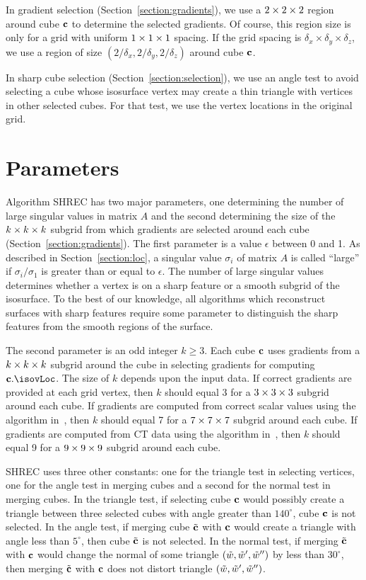 In gradient selection (Section~\ref{section:gradients}),
we use a $2 \times 2 \times 2$ region around cube $\mathbf{c}$ to determine
the selected gradients.
Of course, this region size is only for a grid 
with uniform $1 \times 1 \times 1$ spacing.
If the grid spacing is $\delta_x \times \delta_y \times \delta_z$,
we use a region of size $(2/\delta_x, 2/\delta_y, 2/\delta_z)$
around cube $\mathbf{c}$.

In sharp cube selection (Section~\ref{section:selection}),
we use an angle test to avoid selecting a cube 
whose isosurface vertex may create a thin triangle 
with vertices in other selected cubes.
For that test,
we use the vertex locations in the original grid.


\section{Parameters}
\label{section:parameters}

Algorithm SHREC has two major parameters,
one determining the number of large singular values in matrix $A$
and the second determining the size of the $k \times k \times k$ subgrid 
from which gradients are selected around each cube
(Section~\ref{section:gradients}).
The first parameter is a value $\epsilon$ between 0 and 1.
As described in Section~\ref{section:loc},
a singular value $\sigma_i$ of matrix $A$ 
is called ``large'' if $\sigma_i/\sigma_1$ 
is greater than or equal to $\epsilon$.
The number of large singular values determines whether a vertex
is on a sharp feature or a smooth subgrid of the isosurface.
To the best of our knowledge, all algorithms which reconstruct surfaces 
with sharp features require some parameter
to distinguish the sharp features from the smooth regions of the surface.

The second parameter is an odd integer $k \ge 3$.
Each cube $\mathbf{c}$ uses gradients from a $k \times k \times k$ subgrid around the cube
in selecting gradients for computing $\cb.\isovLoc$.
The size of $k$ depends upon the input data.
If correct gradients are provided at each grid vertex,
then $k$ should equal 3 for a $3 \times 3 \times 3$ subgrid around each cube.
If gradients are computed from correct scalar values 
using the algorithm in~\cite{bw-crgsd-15},
then $k$ should equal 7 for a $7 \times 7 \times 7$ subgrid around each cube.
If gradients are computed from CT data 
using the algorithm in~\cite{bw-crgsd-15},
then $k$ should equal 9 for a $9 \times 9 \times 9$ subgrid around each cube.

SHREC uses three other constants:
one for the triangle test in selecting vertices,
one for the angle test in merging cubes
and a second for the normal test in merging cubes.
In the triangle test,
if selecting cube $\mathbf{c}$ would possibly create a triangle between three
selected cubes with angle greater than $140^\circ$, 
cube $\mathbf{c}$ is not selected.
In the angle test,
if merging cube ${\tilde{\mathbf{c}}}$ with $\mathbf{c}$ would create a triangle with angle
less than $5^\circ$, then cube ${\tilde{\mathbf{c}}}$ is not selected.
In the normal test,
if merging ${\tilde{\mathbf{c}}}$ with $\mathbf{c}$ would change the normal 
of some triangle $(\tilde{w},\tilde{w}',\tilde{w}'')$ by less than $30^\circ$,
then merging ${\tilde{\mathbf{c}}}$ with $\mathbf{c}$ does not distort triangle $(\tilde{w},\tilde{w}',\tilde{w}'')$.

